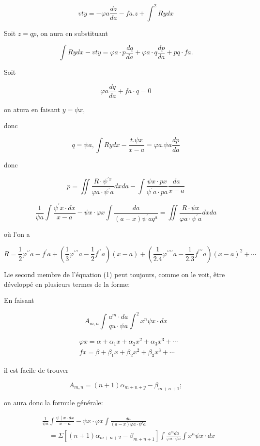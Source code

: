 \documentclass{article}
\begin{document}
\[
v t y=-\varphi a \frac{d z}{d a}-f a . z+\int^{2} R y d x
\]

Soit \(z=q p\), on aura en substituant

\[
\int R y d x-v t y=\varphi a \cdot p \frac{d q}{d a}+\varphi a \cdot q \frac{d p}{d a}+p q \cdot f a .
\]

Soit

\[
\varphi a \frac{d q}{d a}+f a \cdot q=0
\]

on atura en faisant \(y=\psi x\),

donc

\[
q=\psi a, \int R y d x-\frac{t . \psi x}{x-a}=\varphi a . \psi a \frac{d p}{d a}
\]

donc

\[
p=\iint \frac{R \cdot \psi^{\prime x}}{\varphi a \cdot \psi^{\prime} a} d x d a-\int \frac{\psi x \cdot p x}{\psi^{\prime} a \cdot p a} \frac{d a}{x-a}
\]

\[
\frac{1}{\psi a} \int \frac{\psi^{\prime} x \cdot d x}{x-a}-\psi x \cdot \varphi x \int \frac{d a}{(a-x) \psi^{\prime} a q^{a}}=\iint \frac{R \cdot \psi x}{\varphi a \cdot \psi^{\prime} a} d x d a
\]

où l'on a

\[
R=\frac{1}{2} \varphi^{\prime \prime} a-f^{\prime} a+\left(\frac{1}{3} \varphi^{\prime \prime \prime} a-\frac{1}{2} f^{\prime \prime} a\right)(x-a)+\left(\frac{1}{2.4} \varphi^{\prime \prime \prime \prime} a-\frac{1}{2.3} f^{\prime \prime \prime} a\right)(x-a)^{2}+\cdots
\]

Lie second membre de l'équation (1) peut toujours, comme on le voit, être développé en plusieurs termes de la forme:

En faisant

\[
A_{m, n} \int \frac{a^{m} \cdot d a}{q u \cdot \psi a} \int^{2} x^{n} \psi x \cdot d x
\]

\[
\begin{aligned}
& \varphi x=\alpha+\alpha_{1} x+\alpha_{2} x^{2}+\alpha_{3} x^{3}+\cdots \\
& f x=\beta+\beta_{1} x+\beta_{2} x^{2}+\beta_{3} x^{3}+\cdots
\end{aligned}
\]

il est facile de trouver

\[
A_{m, n}=(n+1) \alpha_{m+n+y}-\beta_{m+n+1} ;
\]

on aura donc la formule générale:

\[
\begin{aligned}
& \frac{1}{\psi a} \int \frac{\psi \mid x \cdot d x}{x-a}-\psi x \cdot \varphi x \int \frac{d a}{(a-x) \varphi a \cdot \psi ' a} \\
& \quad=\Sigma\left[(n+1) \alpha_{m+n+2}-\beta_{m+n+1}\right] \int \frac{a^{m} d a}{\varphi a \cdot \psi a} \int x^{n} \psi x \cdot d x
\end{aligned}
\]
\end{document}
